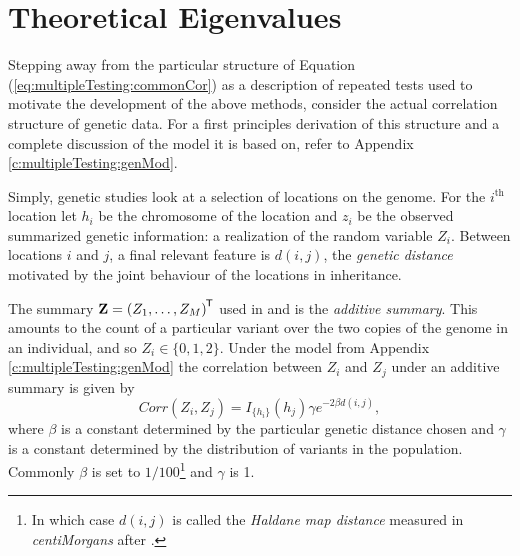 \documentclass[letterpaper,12pt,oneside,final]{article}
\newcommand{\ve}[1]{\mathbf{#1}}           %
\newcommand{\tr}[1]{{#1}^{\mkern-1.5mu\mathsf{T}}}              %
\newcommand{\ind}[2]{I_{#2} \left( #1 \right)}
\begin{document}

\section{Theoretical Eigenvalues} \label{c:multipleTesting:eigen}

Stepping away from the particular structure of Equation (\ref{eq:multipleTesting:commonCor}) as a description of repeated tests used to motivate the development of the above methods, consider the actual correlation structure of genetic data. For a first principles derivation of this structure and a complete discussion of the model it is based on, refer to Appendix \ref{c:multipleTesting:genMod}.

Simply, genetic studies look at a selection of locations on the genome. For the $i^{\text{th}}$ location let $h_i$ be the chromosome of the location and $z_i$ be the observed summarized genetic information: a realization of the random variable $Z_i$. Between locations $i$ and $j$, a final relevant feature is $d(i,j)$, the \emph{genetic distance} motivated by the joint behaviour of the locations in inheritance.

The summary $\ve{Z} = \tr{(Z_1, \dots, Z_M)}$ used in \cite{cheverud2001, nyholt2004, LiJi2005} and \cite{Galwey2009} is the \emph{additive summary}. This amounts to the count of a particular variant over the two copies of the genome in an individual, and so $Z_i \in \{0,1,2\}$. Under the model from Appendix \ref{c:multipleTesting:genMod} the correlation between $Z_i$ and $Z_j$ under an additive summary is given by
\begin{equation} \label{eq:multipleTesting:zcorr}
  Corr(Z_i, Z_j) = \ind{h_j}{\{h_i\}} \gamma e^{-2 \beta d(i,j)},
\end{equation}
where $\beta$ is a constant determined by the particular genetic distance chosen and $\gamma$ is a constant determined by the distribution of variants in the population. Commonly $\beta$ is set to $1/100$\footnote{In which case $d(i,j)$ is called the \emph{Haldane map distance} measured in \emph{centiMorgans} after \cite{haldane1919}.} and $\gamma$ is 1.
\end{document}
